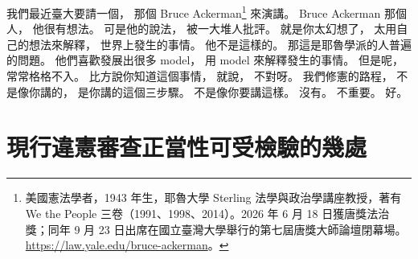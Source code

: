 \hypertarget{w01:cue:839}{}我們最近臺大要請一個，
\hypertarget{w01:cue:840}{}那個 Bruce Ackerman\footnote{美國憲法學者，1943 年生，耶魯大學 Sterling 法學與政治學講座教授，著有 We the People 三卷（1991、1998、2014）。2026 年 6 月 18 日獲唐獎法治獎；同年 9 月 23 日出席在國立臺灣大學舉行的第七屆唐獎大師論壇閉幕場。\url{https://law.yale.edu/bruce-ackerman}。} 來演講。
\hypertarget{w01:cue:841}{}Bruce Ackerman 那個人，
\hypertarget{w01:cue:842}{}他很有想法。
\hypertarget{w01:cue:843}{}可是他的說法，
\hypertarget{w01:cue:844}{}被一大堆人批評。
\hypertarget{w01:cue:845}{}就是你太幻想了，
\hypertarget{w01:cue:846}{}太用自己的想法來解釋，
\hypertarget{w01:cue:847}{}世界上發生的事情。
\hypertarget{w01:cue:848}{}他不是這樣的。
\hypertarget{w01:cue:849}{}那這是耶魯學派的人普遍的問題。
\hypertarget{w01:cue:850}{}他們喜歡發展出很多 model，
\hypertarget{w01:cue:851}{}用 model 來解釋發生的事情。
\hypertarget{w01:cue:852}{}但是呢，
\hypertarget{w01:cue:853}{}常常格格不入。
\hypertarget{w01:cue:854}{}比方說你知道這個事情，
\hypertarget{w01:cue:855}{}就說，
\hypertarget{w01:cue:856}{}不對呀。
\hypertarget{w01:cue:857}{}我們修憲的路程，
\hypertarget{w01:cue:858}{}不是像你講的，
\hypertarget{w01:cue:859}{}是你講的這個三步驟。
\hypertarget{w01:cue:860}{}不是像你要講這樣。
\hypertarget{w01:cue:861}{}沒有。
\hypertarget{w01:cue:862}{}不重要。
\hypertarget{w01:cue:863}{}好。

\section{現行違憲審查正當性可受檢驗的幾處}

